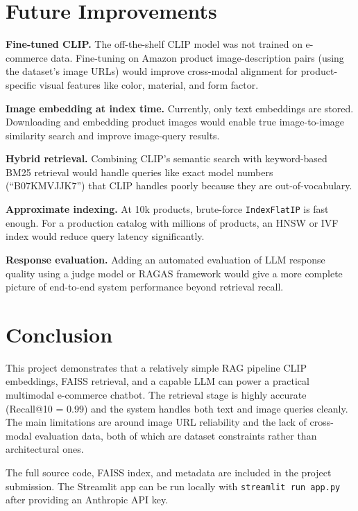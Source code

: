 \documentclass[11pt]{article}
\begin{document}
\section{Future Improvements}

\textbf{Fine-tuned CLIP.}
The off-the-shelf CLIP model was not trained on e-commerce data. Fine-tuning on Amazon
product image-description pairs (using the dataset's image URLs) would improve cross-modal
alignment for product-specific visual features like color, material, and form factor.

\textbf{Image embedding at index time.}
Currently, only text embeddings are stored. Downloading and embedding product images would
enable true image-to-image similarity search and improve image-query results.

\textbf{Hybrid retrieval.}
Combining CLIP's semantic search with keyword-based BM25 retrieval would handle queries
like exact model numbers (``B07KMVJJK7'') that CLIP handles poorly because they are
out-of-vocabulary.

\textbf{Approximate indexing.}
At 10k products, brute-force \texttt{IndexFlatIP} is fast enough. For a production catalog
with millions of products, an HNSW or IVF index would reduce query latency significantly.

\textbf{Response evaluation.}
Adding an automated evaluation of LLM response quality using a judge model or RAGAS
framework would give a more complete picture of end-to-end system performance beyond
retrieval recall.

\section{Conclusion}

This project demonstrates that a relatively simple RAG pipeline CLIP embeddings, FAISS
retrieval, and a capable LLM can power a practical multimodal e-commerce chatbot. The
retrieval stage is highly accurate (Recall@10 = 0.99) and the system handles both text and
image queries cleanly. The main limitations are around image URL reliability and the lack
of cross-modal evaluation data, both of which are dataset constraints rather than
architectural ones.

The full source code, FAISS index, and metadata are included in the project submission.
The Streamlit app can be run locally with \texttt{streamlit run app.py} after providing
an Anthropic API key.
\end{document}
